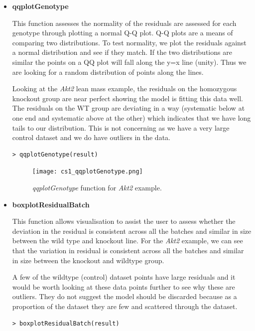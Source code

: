 \documentclass[12pt,a4paper]{article}
\begin{document}
\begin{itemize}
 \item \textbf{qqplotGenotype} 
 
This function assesses the normality of the residuals are assessed for each genotype through plotting a normal Q-Q plot. 
Q-Q plots are a means of comparing two distributions. To test normality, we plot the residuals against a normal distribution and see if they match. 
If the two distributions are similar the points on a QQ plot will fall along the y=x line (unity). Thus we are looking for a random distribution of points along the lines.  

Looking at the \textit{Akt2} lean mass example, the residuals on the homozygous knockout group are near perfect showing the model is fitting this data well.  
The residuals on the WT group are deviating in a way (systematic below at one end and systematic above at the other) which indicates that we have long tails to our distribution. 
This is not concerning as we have a very large control dataset and we do have outliers in the data.  

\begingroup
    \fontsize{8pt}{12pt}\selectfont
\begin{verbatim}
> qqplotGenotype(result)
\end{verbatim}
\endgroup 

\begin{figure}[H]%
\centerline{\texttt{[image: cs1\_qqplotGenotype.png]}}
\caption{\textit{qqplotGenotype} function for \textit{Akt2} example.}\label{fig:17}
\end{figure}

\item \textbf{boxplotResidualBatch} 

This function allows visualisation to assist the user to assess whether the deviation in the residual is consistent across all the batches and similar in size between the wild type and knockout line. 
For the \textit{Akt2} example, we can see that the variation in residual is consistent across all the batches and similar in size between the knockout and wildtype group.

A few of the wildtype (control) dataset points have large residuals and it would be worth looking at these data points further to see why these are outliers. They do not suggest the model should be discarded because as a proportion of the dataset they are few and scattered through the dataset.

\begingroup
    \fontsize{8pt}{12pt}\selectfont
\begin{verbatim}
> boxplotResidualBatch(result)
\end{verbatim}
\endgroup 


\end{itemize}
\end{document}
